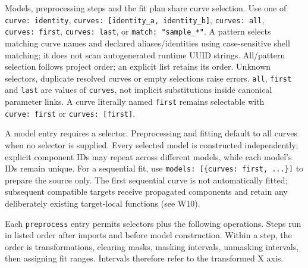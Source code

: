 \documentclass[
  10pt,
  a4paper,
  oneside]{scrreprt}
\begin{document}
Models, preprocessing steps and the fit plan share curve selection. Use
one of \texttt{curve:\ identity},
\texttt{curves:\ {[}identity\_a,\ identity\_b{]}},
\texttt{curves:\ all}, \texttt{curves:\ first}, \texttt{curves:\ last},
or \texttt{match:\ "sample\_*"}. A pattern selects matching curve names
and declared aliases/identities using case-sensitive shell matching; it
does not scan autogenerated runtime UUID strings. All/pattern selection
follows project order; an explicit list retains its order. Unknown
selectors, duplicate resolved curves or empty selections raise errors.
\texttt{all}, \texttt{first} and \texttt{last} are values of
\texttt{curves}, not implicit substitutions inside canonical parameter
links. A curve literally named \texttt{first} remains selectable with
\texttt{curve:\ first} or \texttt{curves:\ {[}first{]}}.

A model entry requires a selector. Preprocessing and fitting default to
all curves when no selector is supplied. Every selected model is
constructed independently; explicit component IDs may repeat across
different models, while each model's IDs remain unique. For a sequential
fit, use \texttt{models:\ {[}\{curves:\ first,\ ...\}{]}} to prepare the
source only. The first sequential curve is not automatically fitted;
subsequent compatible targets receive propagated components and retain
any deliberately existing target-local functions (see W10).

Each \texttt{preprocess} entry permits selectors plus the following
operations. Steps run in listed order after imports and before model
construction. Within a step, the order is transformations, clearing
masks, masking intervals, unmasking intervals, then assigning fit
ranges. Intervals therefore refer to the transformed X axis.
\end{document}
